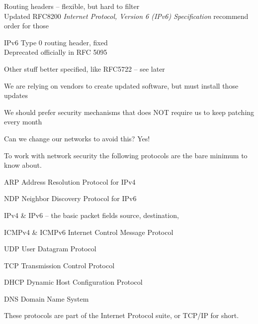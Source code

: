 \documentclass[Screen16to9,17pt]{foils}
\begin{document}
\begin{list2}
\item Routing headers -- flexible, but hard to filter\\
Updated RFC8200 \emph{Internet Protocol, Version 6 (IPv6) Specification} recommend order for those
\item IPv6 Type 0 routing header, fixed\\
Deprecated officially in RFC 5095 
\item Other stuff better specified, like RFC5722 -- see later
\end{list2}

We are relying on vendors to create updated software, but must install those updates




\begin{list2}
\item We should prefer security mechanisms that does NOT require us to keep patching every month
\item Can we change our networks to avoid this? Yes!
\end{list2}


To work with network security the following protocols are the bare minimum to know about.

\begin{list2}
\item ARP Address Resolution Protocol for IPv4
\item NDP Neighbor Discovery Protocol for IPv6
\item IPv4 \& IPv6 -- the basic packet fields source, destination,
\item ICMPv4 \& ICMPv6 Internet Control Message Protocol
\item UDP User Datagram Protocol
\item TCP Transmission Control Protocol
\item DHCP Dynamic Host Configuration Protocol
\item DNS Domain Name System
\end{list2}

These protocols are part of the Internet Protocol suite, or TCP/IP for short.


\end{document}
